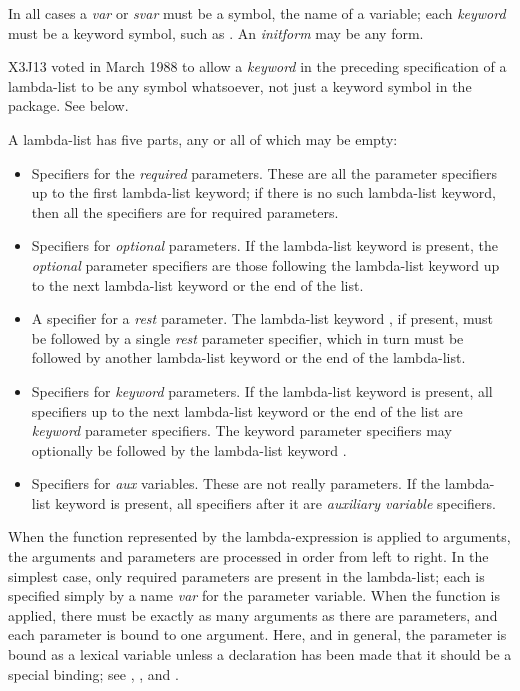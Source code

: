 \begin{obsolete}
In all cases a \textit{var} or \textit{svar} must be a symbol, the name of a variable;
each \textit{keyword} must be a keyword symbol, such as .
An \textit{initform} may be any form.
\end{obsolete}

\begin{newer}
X3J13 voted in March 1988 
to allow a \textit{keyword} in the preceding specification of a lambda-list
to be any symbol whatsoever, not just a keyword symbol
in the  package.  See below.
\end{newer}

A lambda-list has five parts, any or all of which may be empty:
\begin{itemize}
\item
Specifiers for the \textit{required} parameters.  These are all the parameter
specifiers up to the first lambda-list keyword; if there is no such
lambda-list keyword, then all the specifiers are for required parameters.

\item
Specifiers for \textit{optional} parameters.
If the lambda-list keyword  is present,
the \textit{optional} parameter specifiers are those following the
lambda-list keyword  up to the next lambda-list keyword or the end of the list.

\item
A specifier for a \textit{rest} parameter.  The lambda-list keyword , if present, must
be followed by a single \textit{rest} parameter specifier,
which in turn must be followed by another lambda-list keyword or the end
of the lambda-list.

\item
Specifiers for \textit{keyword} parameters.
If the lambda-list keyword  is present, all specifiers up to the next lambda-list keyword
or the end of the list are \textit{keyword} parameter specifiers.
The keyword parameter specifiers may optionally be followed by the
lambda-list keyword .

\item
Specifiers for \textit{aux} variables.  These are not really parameters.
If the lambda-list keyword  is present, all specifiers after it are
\textit{auxiliary variable} specifiers.
\end{itemize}

When the function represented by the lambda-expression is applied
to arguments, the arguments and parameters are processed in order
from left to right.
In the simplest case, only required parameters are present
in the lambda-list; each is specified simply by a name \textit{var} for
the parameter variable.
When the function is applied,
there must be exactly as many arguments as there are parameters,
and each parameter is bound to one argument.  Here, and in general,
the parameter is bound as a lexical variable unless a
declaration has been made that it should be a special binding;
see , , and .

